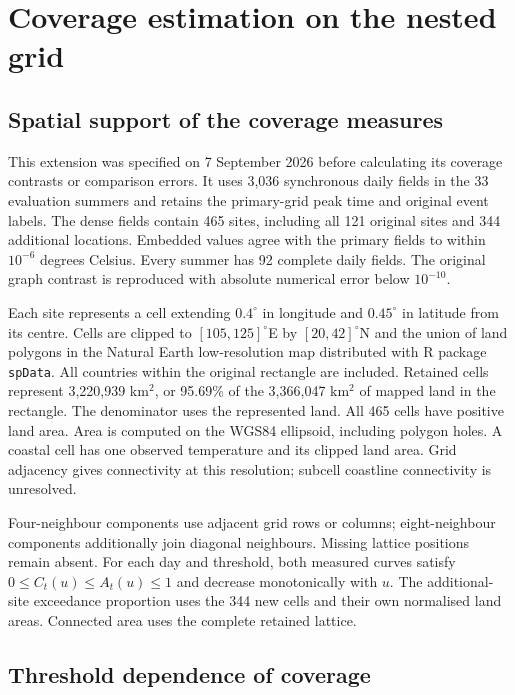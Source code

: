 \section{Coverage estimation on the nested grid}
\label{sec:application-validation}

\subsection{Spatial support of the coverage measures}

This extension was specified on 7 September 2026 before calculating its
coverage contrasts or comparison errors. It uses 3,036 synchronous daily
fields in the 33 evaluation summers and retains the primary-grid peak time
and original event labels. The dense fields contain 465 sites, including all
121 original sites and 344 additional locations. Embedded values agree with
the primary fields to within $10^{-6}$ degrees Celsius. Every summer has
92 complete daily fields. The original graph contrast is reproduced with
absolute numerical error below $10^{-10}$.

Each site represents a cell extending $0.4^\circ$ in longitude and
$0.45^\circ$ in latitude from its centre. Cells are clipped to
$[105,125]^\circ$E by $[20,42]^\circ$N and the union of land polygons in the
Natural Earth low-resolution map distributed with R package \texttt{spData}.
All countries within the original rectangle are included. Retained cells
represent 3,220,939 km$^2$, or 95.69\% of the 3,366,047 km$^2$ of mapped land
in the rectangle. The denominator uses the represented land. All 465 cells
have positive land area. Area is computed on the WGS84 ellipsoid, including
polygon holes. A coastal cell has one observed temperature and its clipped
land area. Grid adjacency gives connectivity at this resolution; subcell
coastline connectivity is unresolved.

Four-neighbour components use adjacent grid rows or columns; eight-neighbour
components additionally join diagonal neighbours. Missing lattice positions
remain absent. For each day and threshold, both measured curves satisfy
$0\le C_t(u)\le A_t(u)\le1$ and decrease monotonically with $u$. The
additional-site exceedance proportion uses the 344 new cells and their own
normalised land areas. Connected area uses the complete retained lattice.

\subsection{Threshold dependence of coverage}

